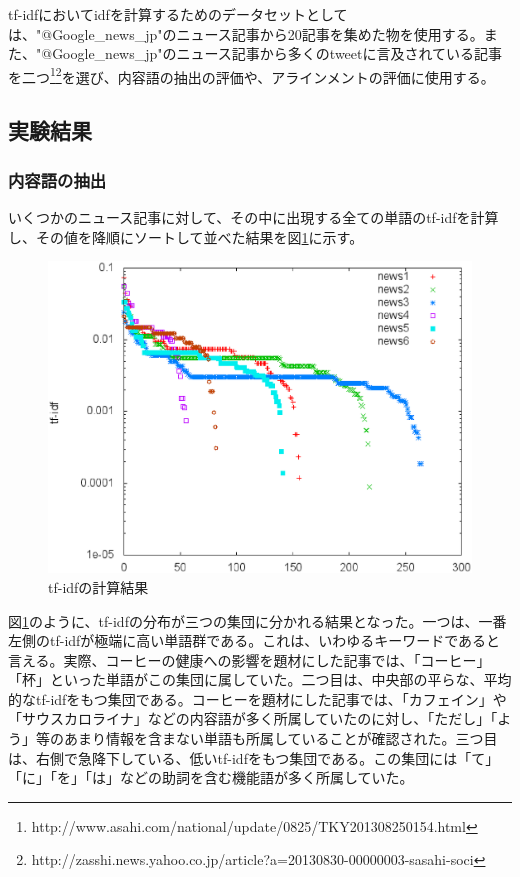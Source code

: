 \documentclass[12pt]{jarticle}
\begin{document}
tf-idfにおいてidfを計算するためのデータセットとしては、"@Google\_news\_jp"のニュース記事から20記事を集めた物を使用する。また、"@Google\_news\_jp"のニュース記事から多くのtweetに言及されている記事を二つ\footnote{http://www.asahi.com/national/update/0825/TKY201308250154.html}\footnote{http://zasshi.news.yahoo.co.jp/article?a=20130830-00000003-sasahi-soci}を選び、内容語の抽出の評価や、アラインメントの評価に使用する。

\subsection{実験結果}
\subsubsection{内容語の抽出}

いくつかのニュース記事に対して、その中に出現する全ての単語のtf-idfを計算し、その値を降順にソートして並べた結果を図\ref{fig2}に示す。

\begin{figure}[htbp]
  \begin{center}
    \includegraphics[scale = 0.5]{image/content_word.eps}
  \end{center}
  \caption{tf-idfの計算結果}
  \label{fig2}
\end{figure}

図\ref{fig2}のように、tf-idfの分布が三つの集団に分かれる結果となった。一つは、一番左側のtf-idfが極端に高い単語群である。これは、いわゆるキーワードであると言える。実際、コーヒーの健康への影響を題材にした記事では、「コーヒー」「杯」といった単語がこの集団に属していた。二つ目は、中央部の平らな、平均的なtf-idfをもつ集団である。コーヒーを題材にした記事では、「カフェイン」や「サウスカロライナ」などの内容語が多く所属していたのに対し、「ただし」「よう」等のあまり情報を含まない単語も所属していることが確認された。三つ目は、右側で急降下している、低いtf-idfをもつ集団である。この集団には「て」「に」「を」「は」などの助詞を含む機能語が多く所属していた。
\end{document}
